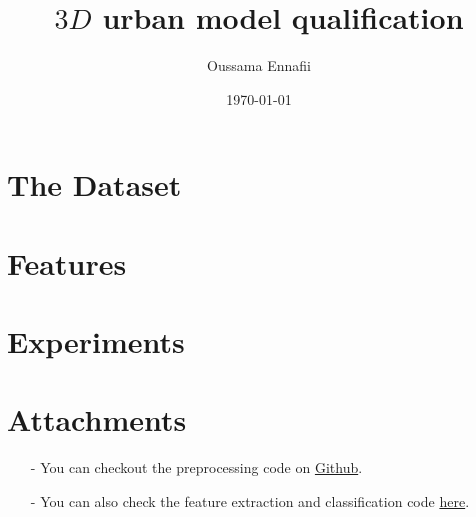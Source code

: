 \documentclass[a4paper, 11pt]{article}
\title{$3D$ urban model qualification}
\author{Oussama Ennafii}
\date{\today}
\begin{document}
	\maketitle

	

	\section{The Dataset}
	

	\section{Features}
	

	\section{Experiments}
	

	\section*{Attachments}
	\begin{itemize}
		\item[-] You can checkout the preprocessing code on
		\href{https://github.com/ethiy/proj.city}{Github}.
		\item[-] You can also check the feature extraction and classification code
		\href{https://github.com/ethiy/qualcity}{here}.
	\end{itemize}

	
	
\end{document}

